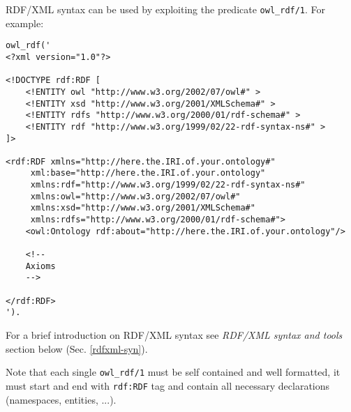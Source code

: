 RDF/XML syntax can be used by exploiting the predicate \verb|owl_rdf/1|. For example:
\begin{verbatim}
owl_rdf('
<?xml version="1.0"?>

<!DOCTYPE rdf:RDF [
    <!ENTITY owl "http://www.w3.org/2002/07/owl#" >
    <!ENTITY xsd "http://www.w3.org/2001/XMLSchema#" >
    <!ENTITY rdfs "http://www.w3.org/2000/01/rdf-schema#" >
    <!ENTITY rdf "http://www.w3.org/1999/02/22-rdf-syntax-ns#" >
]>

<rdf:RDF xmlns="http://here.the.IRI.of.your.ontology#"
     xml:base="http://here.the.IRI.of.your.ontology"
     xmlns:rdf="http://www.w3.org/1999/02/22-rdf-syntax-ns#"
     xmlns:owl="http://www.w3.org/2002/07/owl#"
     xmlns:xsd="http://www.w3.org/2001/XMLSchema#"
     xmlns:rdfs="http://www.w3.org/2000/01/rdf-schema#">
    <owl:Ontology rdf:about="http://here.the.IRI.of.your.ontology"/>

    <!-- 
    Axioms
    -->

</rdf:RDF>
').
\end{verbatim}
For a brief introduction on RDF/XML syntax see \textit{RDF/XML syntax and tools} section below (Sec. \ref{rdfxml-syn}).

Note that each single \verb|owl_rdf/1| must be self contained and well formatted, it must start and end with \verb|rdf:RDF| tag and contain all necessary declarations (namespaces, entities, ...).


